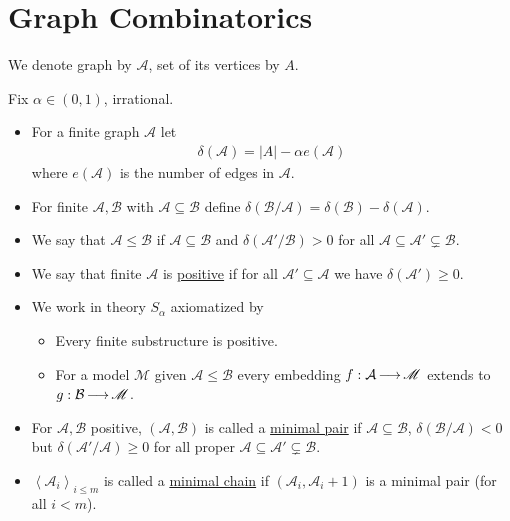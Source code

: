 \documentclass{amsart}
\newcommand{\MM}{\mathscr M}
\newcommand{\defn}{\underline}
\newcommand{\A}{\mathcal A}
\newcommand{\B}{\mathcal B}
\newcommand{\agl}[1]{\left\langle #1 \right\rangle}
\begin{document}



\section{Graph Combinatorics}

We denote graph by $\A$, set of its vertices by $A$.
\begin{Definition}
  Fix $\alpha \in (0,1)$, irrational.
  \begin{itemize}
  \item For a finite graph $\A$ let
    \begin{align*}
      \delta(\A) = |A| - \alpha e(\A)
    \end{align*}
    where $e(\A)$ is the number of edges in $\A$.

  \item For finite $\A,\B$ with $\A \subseteq \B$ define $\delta(\B/\A) = \delta(\B) - \delta(\A)$.
  \item We say that $\A \leq \B$ if $\A \subseteq \B$ and $\delta(\A'/\B) > 0$ for all $\A \subseteq \A' \subsetneq \B$.

  \item We say that finite $\A$ is \defn{positive} if for all $\A' \subseteq \A$ we have $\delta(\A') \geq 0$.

  \item We work in theory $S_\alpha$ axiomatized by
    \begin{itemize}
    \item Every finite substructure is positive.
    \item For a model $\MM$ given $\A \leq \B$ every embedding $f : \A \arr \MM$ extends to $g: \B \arr \MM$.
    \end{itemize}

  \item For $\A, \B$ positive, $(\A, \B)$ is called a \defn{minimal pair} if
    $\A \subseteq \B$, $\delta(\B/\A) < 0$ but $\delta(\A'/\A) \geq 0$ for all proper $\A \subseteq \A' \subsetneq \B$.

  \item $\agl{\A_i}_{i \leq m}$ is called a \defn{minimal chain} if $(\A_i, \A_i+1)$ is a minimal pair (for all $i < m$).


\end{itemize}
\end{Definition}
\end{document}
